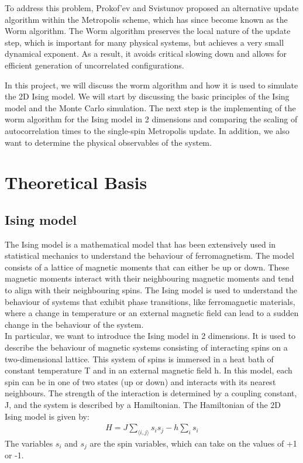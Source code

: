 \documentclass[%
reprint,
 amsmath,amssymb,
 aps,
]{revtex4-2}
\begin{document}
To address this problem, Prokof’ev and Svistunov\cite{PROKOFEV1998} proposed an alternative update algorithm within the Metropolis scheme, which has since become known as the Worm algorithm. The Worm algorithm preserves the local nature of the update step, which is important for many physical systems, but achieves a very small dynamical exponent. As a result, it avoids critical slowing down and allows for efficient generation of uncorrelated configurations.

In this project, we will discuss the worm algorithm and how it is used to simulate the 2D Ising model. We will start by discussing the basic principles of the Ising model and the Monte Carlo simulation. The next step is the implementing of the worm algorithm for the Ising model in 2 dimensions and comparing the scaling of autocorrelation times to the single-spin Metropolis update. In addition, we also want to determine the physical observables of the system.   

\section{Theoretical Basis}
\subsection{Ising model} 
The Ising model is a mathematical model that has been extensively used in statistical mechanics to understand the behaviour of ferromagnetism. The model consists of a lattice of magnetic moments that can either be up or down. These magnetic moments interact with their neighbouring magnetic moments and tend to align with their neighbouring spins. The Ising model is used to understand the behaviour of systems that exhibit phase transitions, like ferromagnetic materials, where a change in temperature or an external magnetic field can lead to a sudden change in the behaviour of the system. \\ 
In particular, we want to introduce the Ising model in 2 dimensions. It is used to describe the behaviour of magnetic systems consisting of interacting spins on a two-dimensional lattice. This system of spins is immersed in a heat bath of constant temperature T and in  an external magnetic field h. In this model, each spin can be in one of two states (up or down) and interacts with its nearest neighbours. The strength of the interaction is determined by a coupling constant, J, and the system is described by a Hamiltonian. The Hamiltonian of the 2D Ising model is given by: 
\begin{align}
    H = J\sum_{\langle i,j \rangle} s_{i}s_{j} - h\sum_{i} s_{i}
\end{align}
The variables $s_i$ and $s_j$ are the spin variables, which can take on the values of +1 or -1.
\end{document}
